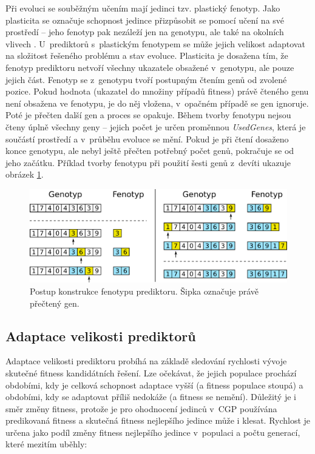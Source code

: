 \documentclass[fleqn,11pt]{ExcelAtFIT} %
\begin{document}
 Při evoluci se souběžným učením mají jedinci tzv. plas\-tic\-ký fenotyp. Jako plasticita se označuje schopnost jedince přizpůsobit se pomocí učení na své prostředí -- jeho fenotyp pak nezáleží jen na genotypu, ale také na okolních vlivech \cite{EllefsenBalancing}. U~prediktorů s~plastickým fenotypem se může jejich velikost adaptovat na složitost řešeného problému a stav evoluce. Plasticita je dosažena tím, že fenotyp prediktoru netvoří všechny ukazatele obsažené v~genotypu, ale pouze jejich část. Fenotyp se z~genotypu tvoří postupným čtením genů od zvolené pozice. Pokud hodnota (ukazatel do množiny případů fitness) právě čteného genu není obsažena ve fenotypu, je do něj vložena, v~opačném případě se gen ignoruje. Poté je přečten další gen a proces se opakuje. Během tvorby fenotypu nejsou čteny úplně všechny geny -- jejich počet je určen proměnnou \emph{UsedGenes}, která je součástí prostředí a v~průběhu evoluce se mění. Pokud je při čtení dosaženo konce genotypu, ale nebyl ještě přečten potřebný počet genů, pokračuje se od jeho začátku. Příklad tvorby fenotypu při použití šesti genů z~devíti ukazuje obrázek \ref{fig:PhenotypeContruction}.

\begin{figure}[hb]
    \centering\includegraphics[width=\linewidth]{images/phenotype2.pdf}
    \caption{Postup konstrukce fenotypu prediktoru. Šipka označuje právě přečtený gen.}
    \label{fig:PhenotypeContruction}
\end{figure}

\subsection{Adaptace velikosti prediktorů}

Adaptace velikosti prediktoru probíhá na základě sledování rychlosti vývoje skutečné fitness kandidátních řešení. Lze očekávat, že jejich populace prochází obdobími, kdy je celková schopnost adaptace vyšší (a fitness populace stoupá) a obdobími, kdy se adaptovat příliš nedokáže (a fitness se nemění). Důležitý je i směr změny fitness, protože je pro ohodnocení je\-din\-ců v~CGP používána predikovaná fitness a skutečná fitness nejlepšího jedince může i klesat. Rychlost je určena jako podíl změny fitness nejlepšího jedince v~populaci a počtu generací, které mezitím uběhly:
\end{document}
